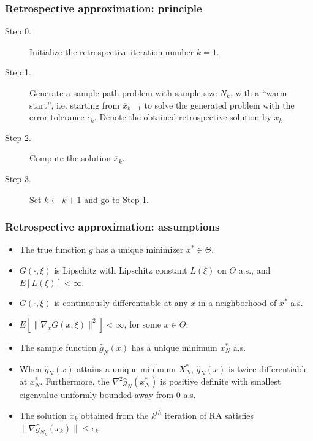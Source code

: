 \documentclass{beamer}
\begin{document}
\begin{frame}
\frametitle{Retrospective approximation: principle}

\begin{description}
\item[Step 0.]
Initialize the retrospective iteration number $k = 1$.
\item[Step 1.]
Generate a sample-path problem with sample size $N_k$, with a ``warm start'', i.e. starting from $\overline{x}_{k-1}$ %
to solve the generated problem with the error-tolerance $\epsilon_k$.
Denote the obtained retrospective solution by $x_k$.
\item[Step 2.]
Compute the solution $\overline{x}_k$.
\item[Step 3.]
Set $k \leftarrow k + 1$ and go to Step 1.
\end{description}

\end{frame}

\begin{frame}
\frametitle{Retrospective approximation: assumptions}

\begin{itemize}
\item
The true function $g$ has a unique minimizer $x^* \in \Theta$.
\item
$G(\cdot,\xi)$ is Lipschitz with Lipschitz constant $L(\xi)$ on $\Theta$ a.s., and $E[L(\xi)] < \infty$.
\item
$G(\cdot,\xi)$ is continuously differentiable at any $x$ in a neighborhood of $x^*$ a.s.
\item
$E[\|\nabla_x G(x,\xi)\|^2] < \infty$, for some $x \in \Theta$.
\item
The sample function $\hat{g}_N(x)$ has a unique minimum $x_N^*$ a.s.
\item
When $\hat{g}_N(x)$ attains a unique minimum $X_N^*$, $\hat{g}_N(x)$ is twice differentiable at $x_N^*$.
Furthermore, the $\nabla^2 \hat{g}_N (x_N^*)$ is positive definite with smallest eigenvalue uniformly bounded away from 0 a.s.
\item
The solution $x_k$ obtained from the $k^{th}$ iteration of RA satisfies $\| \nabla \hat{g}_{N_k}(x_k) \| \leq \epsilon_k$.
\end{itemize}

\end{frame}
\end{document}
